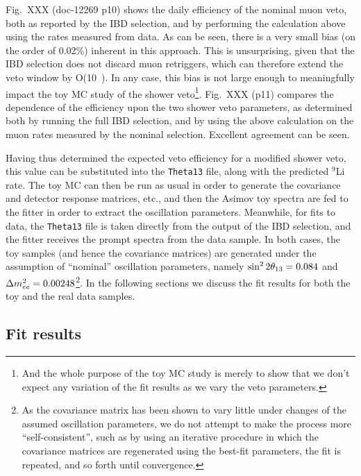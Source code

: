 \documentclass[../thesis.tex]{subfiles}
\begin{document}
Fig.~XXX (doc-12269 p10) shows the daily efficiency of the nominal muon veto, both as reported by the IBD selection, and by performing the calculation above using the rates measured from data. As can be seen, there is a very small bias (on the order of 0.02\%) inherent in this approach. This is unsurprising, given that the IBD selection does not discard muon retriggers, which can therefore extend the veto window by O(10~\us). In any case, this bias is not large enough to meaningfully impact the toy MC study of the shower veto\footnote{And the whole purpose of the toy MC study is merely to show that we don't expect any variation of the fit results as we vary the veto parameters.}. Fig.~XXX (p11) compares the dependence of the efficiency upon the two shower veto parameters, as determined both by running the full IBD selection, and by using the above calculation on the muon rates measured by the nominal selection. Excellent agreement can be seen.

Having thus determined the expected veto efficiency for a modified shower veto, this value can be substituted into the \texttt{Theta13} file, along with the predicted $^9$Li rate. The toy MC can then be run as usual in order to generate the covariance and detector response matrices, etc., and then the Asimov toy spectra are fed to the fitter in order to extract the oscillation parameters. Meanwhile, for fits to data, the \texttt{Theta13} file is taken directly from the output of the IBD selection, and the fitter receives the prompt spectra from the data sample. In both cases, the toy samples (and hence the covariance matrices) are generated under the assumption of ``nominal'' oscillation parameters, namely $\sin^2 2\theta_{13} = 0.084$ and $\Delta m^2_{ee} = 0.00248$\footnote{As the covariance matrix has been shown to vary little under changes of the assumed oscillation parameters, we do not attempt to make the process more ``self-consistent'', such as by using an iterative procedure in which the covariance matrices are regenerated using the best-fit parameters, the fit is repeated, and so forth until convergence.}. In the following sections we discuss the fit results for both the toy and the real data samples.

\begin{comment}
Regarding results: Don't comment on ``structure'' until we've regenerated the 2D plots using the fix to SinglesCalc::calcSinglesHz. (Accidentals rate might have been biased, throwing off the fit.)
\end{comment}

\subsection{Fit results}%
\label{sec:cutVaryMuVetoDataResults}
\end{document}
